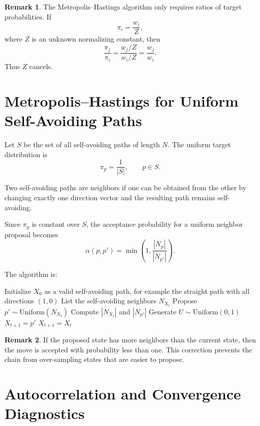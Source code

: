 \documentclass[12pt,oneside]{book}
\numberwithin{equation}{section}
\theoremstyle{definition}
\newtheorem{remark}{Remark}[section]
\theoremstyle{plain}
\theoremstyle{remark}
\begin{document}
\begin{remark}
The Metropolis--Hastings algorithm only requires ratios of target probabilities. If
\[
\pi_i=\frac{w_i}{Z},
\]
where $Z$ is an unknown normalizing constant, then
\[
\frac{\pi_j}{\pi_i}
=
\frac{w_j/Z}{w_i/Z}
=
\frac{w_j}{w_i}.
\]
Thus $Z$ cancels.
\end{remark}

\section{Metropolis--Hastings for Uniform Self-Avoiding Paths}

Let $S$ be the set of all self-avoiding paths of length $N$. The uniform target distribution is
\[
\pi_p=\frac{1}{|S|},
\qquad p\in S.
\]

Two self-avoiding paths are neighbors if one can be obtained from the other by changing exactly one direction vector and the resulting path remains self-avoiding.

Since $\pi_p$ is constant over $S$, the acceptance probability for a uniform neighbor proposal becomes
\[
\alpha(p,p')
=
\min\left(1,\frac{|N_p|}{|N_{p'}|}\right).
\]

The algorithm is:

\begin{algorithm}[H]
\caption{Metropolis--Hastings for Uniform Self-Avoiding Paths}
\begin{algorithmic}[1]
\State Initialize $X_0$ as a valid self-avoiding path, for example the straight path with all directions $(1,0)$
    \State List the self-avoiding neighbors $N_{X_t}$
    \State Propose $p'\sim \mathrm{Uniform}(N_{X_t})$
    \State Compute $|N_{X_t}|$ and $|N_{p'}|$
    \State Generate $U\sim \mathrm{Uniform}(0,1)$
        \State $X_{t+1}=p'$
    \Else
        \State $X_{t+1}=X_t$
    \EndIf
\EndFor
\end{algorithmic}
\end{algorithm}

\begin{remark}
If the proposed state has more neighbors than the current state, then the move is accepted with probability less than one. This correction prevents the chain from over-sampling states that are easier to propose.
\end{remark}

\section{Autocorrelation and Convergence Diagnostics}
\end{document}
